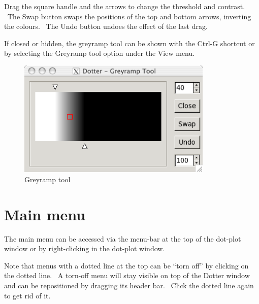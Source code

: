 \documentclass{report}
\begin{document}
\bigskip

{Drag the square handle and the arrows to change the threshold and
contrast. \ The {\textquotesingle}Swap{\textquotesingle} button swaps
the positions of the top and bottom arrows, inverting the colours.
\ The {\textquotesingle}Undo{\textquotesingle} button undoes the effect
of the last drag.}

\bigskip

{If closed or hidden, the greyramp tool can be shown with the
{\textquotesingle}Ctrl-G{\textquotesingle} shortcut or by selecting the
{\textquotesingle}Greyramp tool{\textquotesingle} option under the
{\textquotesingle}View{\textquotesingle} menu.}

\begin{figure}
 \centering
 \color[rgb]{0.30980393,0.5058824,0.7411765}
 \includegraphics[width=9.287cm,height=5.567cm]{img_window_greyramp.png}
 \caption{Greyramp tool}
\end{figure}

\bigskip

{\color[rgb]{0.0,0.27058825,0.5254902}\section[Main menu]{Main menu}}
{The main menu can be accessed via the menu-bar at the top of the
dot-plot window or by right-clicking in the dot-plot window.}

\bigskip

{Note that menus with a dotted line at the top can be
{\textquotedblleft}torn off{\textquotedblright} by clicking on the
dotted line. \ A torn-off menu will stay visible on top of the Dotter
window and can be repositioned by dragging its header bar. \ Click the
dotted line again to get rid of it. }
\end{document}
